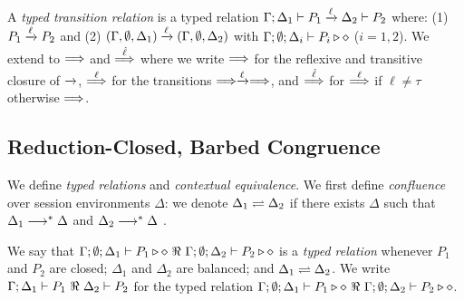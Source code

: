 \begin{definition}\label{d:tlts}\rm
A {\em typed transition relation} is a typed relation
$\Gamma; \Delta_1 \vdash P_1 \xrightarrow{\ell} \Delta_2 \vdash P_2$
	where:
%
(1) $P_1 \xrightarrow{\ell} P_2$ and (2) 
$(\Gamma, \emptyset, \Delta_1) \xrightarrow{\ell} (\Gamma, \emptyset, \Delta_2)$ 
with $\Gamma; \emptyset; \Delta_i \vdash P_i \triangleright \diamond$ 
($i=1,2$).
%
%
We extend to $\stackrel{}{\Longrightarrow}$ 
and $\stackrel{\hat{\ell}}{\Longrightarrow}$ 
where we write 
$\stackrel{}{\Longrightarrow}$ for the reflexive and
transitive closure of $\xrightarrow{}$, $\stackrel{\ell}{\Longrightarrow}$ for the transitions
$\stackrel{}{\Longrightarrow}\xrightarrow{\ell}\stackrel{}{\Longrightarrow}$, and $\stackrel{\hat{\ell}}{\Longrightarrow}$ for $\stackrel{\ell}{\Longrightarrow}$ if
$\ell\not = \tau$ otherwise $\stackrel{}{\Longrightarrow}$. 
\end{definition}

\subsection{Reduction-Closed, Barbed Congruence}
\label{subsec:rc}
\noi We define \emph{typed relations} and \emph{contextual equivalence}.  
We first define \emph{confluence}
over session environments $\Delta$:
we denote $\Delta_1 \rightleftharpoons \Delta_2$ if there exists $\Delta$ such that
	$\Delta_1 \longrightarrow^\ast \Delta$ and $\Delta_2 \longrightarrow^\ast \Delta$
	.

\begin{definition}\rm %
	We say that
	$\Gamma; \emptyset; \Delta_1 \vdash P_1 \triangleright \diamond\ \Re \ \Gamma; \emptyset; \Delta_2 \vdash P_2 \triangleright \diamond$
	is a {\em typed relation} whenever $P_1$ and $P_2$ are closed;
		$\Delta_1$ and $\Delta_2$ are balanced; and 
		$\Delta_1 \rightleftharpoons \Delta_2$.
We write
$\horel{\Gamma}{\Delta_1}{P_1}{\ \Re \ }{\Delta_2}{P_2}$
for the typed relation $\Gamma; \emptyset; \Delta_1 \vdash P_1 \triangleright \diamond\ \Re \ \Gamma; \emptyset; \Delta_2 \vdash P_2 \triangleright \diamond$.
\end{definition}

